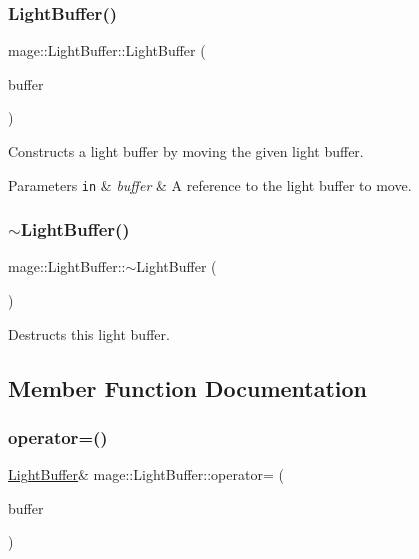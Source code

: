 \subsubsection{\texorpdfstring{Light\+Buffer()}{LightBuffer()}\hspace{0.1cm}{\footnotesize\ttfamily [3/3]}}
{\footnotesize\ttfamily mage\+::\+Light\+Buffer\+::\+Light\+Buffer (\begin{DoxyParamCaption}\item[{\hyperlink{structmage_1_1_light_buffer}{Light\+Buffer} \&\&}]{buffer }\end{DoxyParamCaption})\hspace{0.3cm}{\ttfamily [default]}}

Constructs a light buffer by moving the given light buffer.


\begin{DoxyParams}[1]{Parameters}
\mbox{\tt in}  & {\em buffer} & A reference to the light buffer to move. \\
\hline
\end{DoxyParams}
\hypertarget{structmage_1_1_light_buffer_a0dc88c8ad1721b4b545c65c26c2fec69}{}\label{structmage_1_1_light_buffer_a0dc88c8ad1721b4b545c65c26c2fec69} 
\subsubsection{\texorpdfstring{$\sim$\+Light\+Buffer()}{~LightBuffer()}}
{\footnotesize\ttfamily mage\+::\+Light\+Buffer\+::$\sim$\+Light\+Buffer (\begin{DoxyParamCaption}{ }\end{DoxyParamCaption})\hspace{0.3cm}{\ttfamily [default]}}

Destructs this light buffer. 

\subsection{Member Function Documentation}
\hypertarget{structmage_1_1_light_buffer_ae3560a8dcda61fb02b86a370cd689e15}{}\label{structmage_1_1_light_buffer_ae3560a8dcda61fb02b86a370cd689e15} 
\subsubsection{\texorpdfstring{operator=()}{operator=()}\hspace{0.1cm}{\footnotesize\ttfamily [1/2]}}
{\footnotesize\ttfamily \hyperlink{structmage_1_1_light_buffer}{Light\+Buffer}\& mage\+::\+Light\+Buffer\+::operator= (\begin{DoxyParamCaption}\item[{const \hyperlink{structmage_1_1_light_buffer}{Light\+Buffer} \&}]{buffer }\end{DoxyParamCaption})\hspace{0.3cm}{\ttfamily [default]}}

